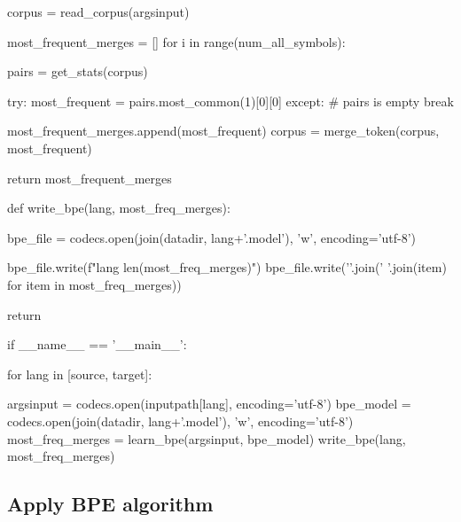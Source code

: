 \begin{python}
    corpus = read_corpus(argsinput)

    most_frequent_merges = []
    for i in range(num_all_symbols):

	    pairs = get_stats(corpus)

        try:
            most_frequent = pairs.most_common(1)[0][0]
        except:
            # pairs is empty
            break

        most_frequent_merges.append(most_frequent)
        corpus = merge_token(corpus, most_frequent)

    return most_frequent_merges


def write_bpe(lang, most_freq_merges):

    bpe_file = codecs.open(join(datadir, lang+'.model'), 'w', encoding='utf-8')

    bpe_file.write(f"{lang} {len(most_freq_merges)}\n")
    bpe_file.write('\n'.join(' '.join(item) for item in most_freq_merges))

    return

if __name__ == '__main__':

    for lang in [source, target]:

        argsinput = codecs.open(inputpath[lang], encoding='utf-8')
        bpe_model = codecs.open(join(datadir, lang+'.model'), 'w', encoding='utf-8')
        most_freq_merges = learn_bpe(argsinput, bpe_model)
        write_bpe(lang, most_freq_merges)
\end{python}

\subsection{Apply BPE algorithm}

